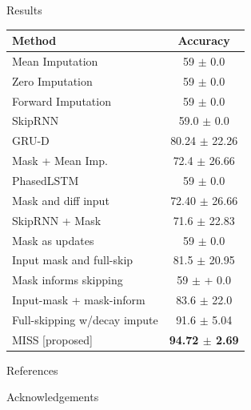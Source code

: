 \documentclass[final, 18pt]{beamer}
\newlength{\sepwid}
\newlength{\onecolwid}
\begin{document}
\begin{frame}
\begin{columns}[t]
\begin{column}{\onecolwid}
\begin{alertblock}{\centering Results}
\begin{table}
\centering
\begin{tabular}{lc}
\toprule
Method & Accuracy\\
\midrule
Mean Imputation    & 59 $\pm$ 0.0 \\ 
Zero Imputation    & 59 $\pm$ 0.0 \\ 
Forward Imputation & 59 $\pm$ 0.0 \\ 
\midrule
SkipRNN \cite{campos2018skip}              & 59.0 $\pm$ 0.0 \\ 
GRU-D \cite{che2018recurrent}              & 80.24 $\pm$ 22.26\\ 
Mask + Mean Imp. \cite{lipton2016modeling} & 72.4 $\pm$ 26.66  \\ 
PhasedLSTM \cite{neil2016phased}           & 59 $\pm$ 0.0 \\
\midrule
Mask and diff input          & 72.40 $\pm$ 26.66 \\ 
SkipRNN + Mask               & 71.6 $\pm$ 22.83 \\ 
Mask as updates              & 59 $\pm$ 0.0 \\ 
Input mask and full-skip     & 81.5 $\pm$ 20.95 \\ 
Mask informs skipping        & 59 $\pm$ + 0.0 \\ 
Input-mask + mask-inform     & 83.6 $\pm$ 22.0 \\ 
Full-skipping w/decay impute & 91.6 $\pm$ 5.04  \\ 
MISS [proposed]              & \textbf{94.72 $\pm$ 2.69} \\
\bottomrule
\end{tabular}
\end{table}

\end{alertblock}

\begin{alertblock}{References}
\tiny{
\vspace{1cm}}
\end{alertblock}

\begin{alertblock}{\centering Acknowledgements}
\small{}
\end{alertblock}

\end{column} %

\begin{column}{\sepwid}\end{column}

\end{columns} %

\end{frame} %
\end{document}
